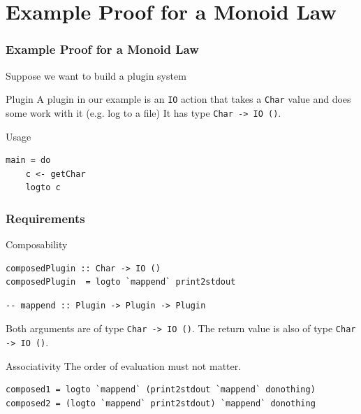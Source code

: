 \documentclass{beamer}
\begin{document}
\lstset{
basicstyle=\ttfamily,
columns=fullflexible,
keepspaces=true,
captionpos=b
}

\section{Example Proof for a Monoid Law }

\begin{frame}[fragile]
\frametitle{Example Proof for a Monoid Law}
  Suppose we want to build a plugin system

  \begin{block}{Plugin}
A plugin in our example is an \verb|IO| action that takes a \verb|Char| value and does some work with it (e.g. log to a file) It has type \verb|Char -> IO ()|.\end{block}

\begin{block}{Usage}
\begin{verbatim}
main = do
    c <- getChar
    logto c
\end{verbatim}
\end{block}
\end{frame}

\begin{frame}[fragile]
\frametitle{Requirements}
\begin{block}{Composability}
\begin{Verbatim}[fontsize=\footnotesize]
composedPlugin :: Char -> IO ()
composedPlugin  = logto `mappend` print2stdout
\end{Verbatim}

\begin{Verbatim}[fontsize=\footnotesize]
-- mappend :: Plugin -> Plugin -> Plugin
\end{Verbatim}

Both arguments are of type \verb|Char -> IO ()|. The return value is also of type \verb|Char -> IO ()|.
\end{block}
\begin{block}{Associativity}
The order of evaluation must not matter.
\begin{Verbatim}[fontsize=\footnotesize]
composed1 = logto `mappend` (print2stdout `mappend` donothing)
composed2 = (logto `mappend` print2stdout) `mappend` donothing
\end{Verbatim}
  
\end{block}
\end{frame}
\end{document}
